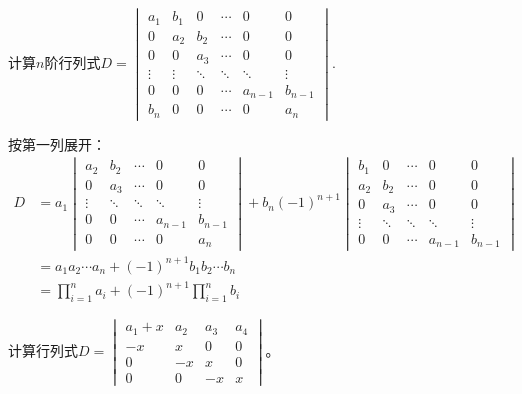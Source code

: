 \documentclass[a4paper]{report}
\begin{document}
\EX 计算$n$阶行列式$D=
\begin{vmatrix}
a_1&b_1&0&\cdots&0&0\\
0&a_2&b_2&\cdots&0&0\\
0&0&a_3&\cdots&0&0\\
\vdots&\vdots&\ddots&\ddots&\ddots&\vdots\\
0&0&0&\cdots&a_{n-1}&b_{n-1}\\
b_{n}&0&0&\cdots&0&a_n
\end{vmatrix}
$.

\begin{jie}
按第一列展开：
\begin{align*}
D&=a_{1}
\begin{vmatrix}
a_2&b_2&\cdots&0&0\\
0&a_3&\cdots&0&0\\
\vdots&\ddots&\ddots&\ddots&\vdots\\
0&0&\cdots&a_{n-1}&b_{n-1}\\
0&0&\cdots&0&a_n
\end{vmatrix}+b_{n}(-1)^{n+1}
\begin{vmatrix}
b_1&0&\cdots&0&0\\
a_2&b_2&\cdots&0&0\\
0&a_3&\cdots&0&0\\
\vdots&\ddots&\ddots&\ddots&\vdots\\
0&0&\cdots&a_{n-1}&b_{n-1}
\end{vmatrix}\\
&=a_1a_2\cdots a_{n}+(-1)^{n+1}b_1b_2\cdots b_n\\
&=\prod_{i=1}^{n}a_i+(-1)^{n+1}\prod_{i=1}^{n}b_i
\end{align*}
\end{jie}
\EX 计算行列式$
D=\begin{vmatrix}
a_1+x&a_2&a_3&a_4\\
-x&x&0&0\\
0&-x&x&0\\
0&0&-x&x
  \end{vmatrix}
$。
\end{document}
